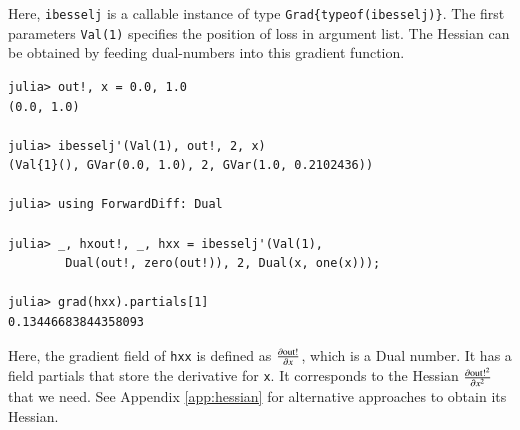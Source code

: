 \documentclass{article}
\newcommand{\<}{\langle}
\renewcommand{\>}{\rangle}
\newcommand{\App}[1]{Appendix \ref{#1}}
\theoremstyle{definition}\newtheorem{definition}{\textit{Definition}}
\begin{document}
Here, \texttt{ibesselj\textquotesingle} is a callable instance of type \texttt{Grad\{typeof(ibesselj)\}}. The first parameters \texttt{Val(1)} specifies the position of loss in argument list. 
The Hessian can be obtained by feeding dual-numbers into this gradient function.

\begin{minipage}{.88\columnwidth}
\begin{lstlisting}
julia> out!, x = 0.0, 1.0
(0.0, 1.0)

julia> ibesselj'(Val(1), out!, 2, x)
(Val{1}(), GVar(0.0, 1.0), 2, GVar(1.0, 0.2102436))

julia> using ForwardDiff: Dual

julia> _, hxout!, _, hxx = ibesselj'(Val(1), 
        Dual(out!, zero(out!)), 2, Dual(x, one(x)));

julia> grad(hxx).partials[1]
0.13446683844358093
\end{lstlisting}
\end{minipage}

Here, the gradient field of \texttt{hxx} is defined as $\frac{\partial {\rm out!}}{\partial x}$, which is a Dual number.
It has a field partials that store the derivative for \texttt{x}.
It corresponds to the Hessian $\frac{\partial{\rm out!}^2}{\partial x^2}$ that we need.
See \App{app:hessian} for alternative approaches to obtain its Hessian.
\end{document}
